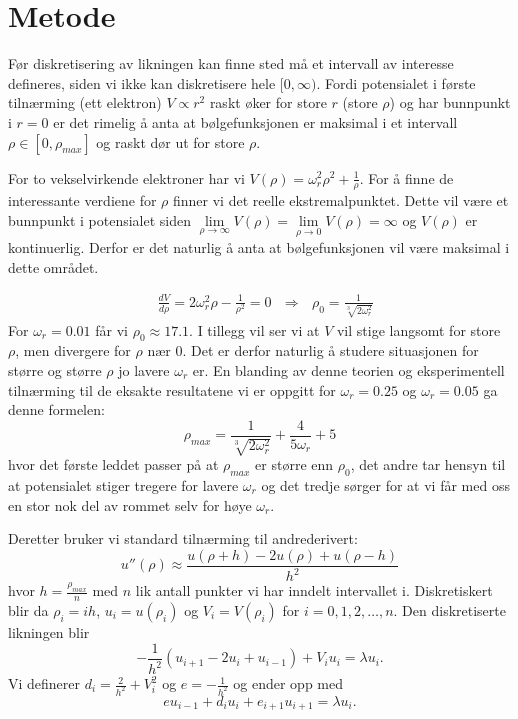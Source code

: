 \documentclass[norsk, 12pt]{article}
\newcommand{\f}{\frac}
\begin{document}
\section{Metode}
Før diskretisering av likningen kan finne sted må et intervall av interesse defineres, siden vi ikke kan diskretisere
hele $[0,\infty)$. Fordi potensialet i første tilnærming (ett elektron) $V\propto r^2$ raskt øker for store $r$ (store $\rho$) og har bunnpunkt i $r=0$ er
det rimelig å anta at bølgefunksjonen er maksimal i et intervall $\rho \in [0, \rho_{max}]$ og raskt dør ut for 
store $\rho$.

For to vekselvirkende elektroner har vi $V(\rho) = \omega_r^2\rho^2+\f{1}{\rho}$. For å finne de interessante verdiene
for $\rho$ finner vi det reelle ekstremalpunktet. Dette vil være et bunnpunkt i potensialet siden 
$\lim\limits_{\rho\rightarrow\infty}V(\rho) = \lim\limits_{\rho\rightarrow0} V(\rho) = \infty$ og $V(\rho)$ er kontinuerlig.
Derfor er det naturlig å anta at bølgefunksjonen vil være maksimal i dette området.

\begin{align*}
&\f{dV}{d\rho}=2\omega_r^2\rho-\f{1}{\rho^2}=0\ \ \ \Rightarrow\ \ \ \rho_{0}=\f{1}{\sqrt[3]{2\omega_r^2}}
\end{align*}
For $\omega_r = 0.01$ får vi $\rho_0 \approx 17.1$. I tillegg vil ser vi at $V$ vil stige langsomt for store $\rho$,
men divergere for $\rho$ nær 0. Det er derfor naturlig å studere situasjonen for større og større $\rho$ jo lavere
$\omega_r$ er.
En blanding av denne teorien og eksperimentell tilnærming til de eksakte resultatene vi er oppgitt for
$\omega_r = 0.25$ og $\omega_r=0.05$ ga denne formelen:
$$\rho_{max} = \f{1}{\sqrt[3]{2\omega_r^2}} +\f{4}{5\omega_r} + 5$$
hvor det første leddet passer på at $\rho_{max}$ er større enn $\rho_0$, det andre tar hensyn til at potensialet
stiger tregere for lavere $\omega_r$ og det tredje sørger for at vi får med oss en stor nok del av rommet selv for høye
$\omega_r$.


Deretter bruker vi standard tilnærming til andrederivert:
$$u''(\rho)\approx \f{u(\rho+h)-2u(\rho)+u(\rho-h)}{h^2}$$
hvor $h=\f{\rho_{max}}{n}$ med $n$ lik antall punkter vi har inndelt intervallet i. Diskretiskert blir da $\rho_i = ih$, $u_i = u(\rho_i)$ og $V_i = V(\rho_i)$
for $i=0,1,2,\dots ,n$. Den diskretiserte likningen blir
$$-\f{1}{h^2}(u_{i+1} -2u_i+u_{i-1}) + V_iu_i = \lambda u_i.$$
Vi definerer $d_i = \f{2}{h^2}+V_i^2$ og $e = -\f{1}{h^2}$ og ender opp med
$$eu_{i-1}+d_iu_i+e_{i+1}u_{i+1} = \lambda u_i.$$
\end{document}
